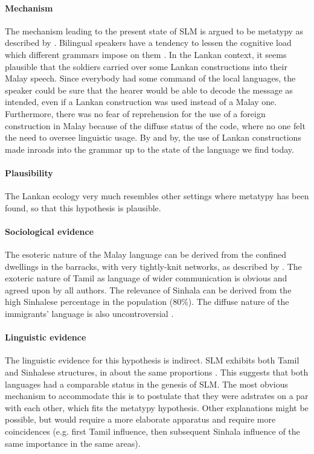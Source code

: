 \paragraph{Mechanism}
The mechanism leading to the present state of SLM is argued to be metatypy as described by \citet{Ross1996,Ross1997,Ross2007}.  Bilingual speakers have a tendency to lessen the cognitive load which different grammars impose on them \citep{Nadkarni1975, Ross2007}. In the Lankan context, it seems plausible that the soldiers carried over some Lankan constructions into their Malay speech. Since everybody had some command of the local languages, the speaker could be sure that the hearer would be able to decode the message as intended, even if a Lankan construction was used instead of a Malay one. Furthermore, there was no fear of reprehension for the use of a foreign construction in Malay because of the diffuse status of the code, where no one felt the need to oversee linguistic usage. By and by, the use of Lankan constructions made inroads into the grammar up to the state of the language we find today.

\paragraph{Plausibility}
The Lankan ecology very much resembles other settings where metatypy has been found, so that this hypothesis is plausible.

\paragraph{Sociological evidence}
The esoteric nature of the Malay language can be derived from the confined dwellings in the barracks, with very tightly-knit networks, as described by \citep{Hussainmiya1990}. The exoteric nature of Tamil as language of wider communication is obvious and agreed upon by all authors. The relevance of Sinhala can be derived from the high Sinhalese percentage in the population (80\%). The diffuse nature of the immigrants' language is also uncontroversial \citep[163]{SmithEtAl2006cll}.

\paragraph{Linguistic evidence}
The linguistic evidence for this hypothesis is indirect. SLM exhibits both Tamil and Sinhalese structures, in about the same proportions \citep{AnsaldoEtAl2006SWL,AnsaldoEtAlFCLT}. This suggests that both languages had a comparable status in the genesis of SLM. The most obvious mechanism to accommodate this is to postulate that they were adstrates on a par with each other, which fits the metatypy hypothesis. Other explanations might be possible, but would require a more elaborate apparatus and require more coincidences (e.g. first Tamil influence, then subsequent Sinhala influence of the same importance in the same areas).


